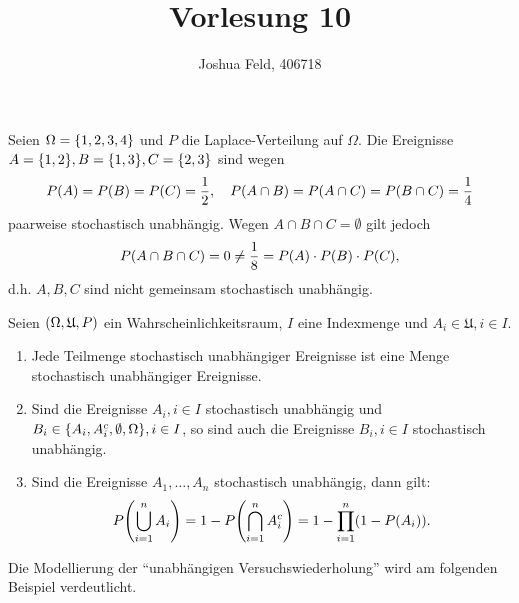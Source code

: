 \documentclass{lecture}
\institute{Institut für Statistik und Wirtschaftsmathematik}
\title{Vorlesung 10}
\author{Joshua Feld, 406718}
\begin{document}
    \maketitle


    \begin{example}
        Seien \(\Omega = \braces*{1, 2, 3, 4}\) und \(P\) die Laplace-Verteilung auf \(\Omega\).
        Die Ereignisse \(A = \braces*{1, 2}, B = \braces*{1, 3}, C = \braces*{2, 3}\) sind wegen
        \[
            P\parentheses*{A} = P\parentheses*{B} = P\parentheses*{C} = \frac{1}{2}, \quad P\parentheses*{A \cap B} = P\parentheses*{A \cap C} = P\parentheses*{B \cap C} = \frac{1}{4}
        \]
        paarweise stochastisch unabhängig.
        Wegen \(A \cap B \cap C = \emptyset\) gilt jedoch
        \[
            P\parentheses*{A \cap B \cap C} = 0 \ne \frac{1}{8} = P\parentheses*{A} \cdot P\parentheses*{B} \cdot P\parentheses* {C},
        \]
        d.h. \(A, B, C\) sind nicht gemeinsam stochastisch unabhängig.
    \end{example}

    \begin{lemma}
        Seien \(\parentheses*{\Omega, \mathfrak{U}, P}\) ein Wahrscheinlichkeitsraum, \(I\) eine Indexmenge und \(A_i \in \mathfrak{U}, i \in I\).
        \begin{enumerate}
            \item Jede Teilmenge stochastisch unabhängiger Ereignisse ist eine Menge stochastisch unabhängiger Ereignisse.
            \item Sind die Ereignisse \(A_i, i \in I\) stochastisch unabhängig und \(B_i \in \braces*{A_i, A_i^c, \emptyset, \Omega}, i \in I\), so sind auch die Ereignisse \(B_i, i \in I\) stochastisch unabhängig.
            \item Sind die Ereignisse \(A_1, \ldots, A_n\) stochastisch unabhängig, dann gilt:
            \[
                P\parentheses*{\bigcup_{i = 1}^n A_i} = 1 - P\parentheses*{\bigcap_{i = 1}^n A_i^c} = 1 - \prod_{i = 1}^n\parentheses*{1 - P\parentheses*{A_i}}.
            \]
        \end{enumerate}
    \end{lemma}

    Die Modellierung der ``unabhängigen Versuchswiederholung'' wird am folgenden Beispiel verdeutlicht.
\end{document}
